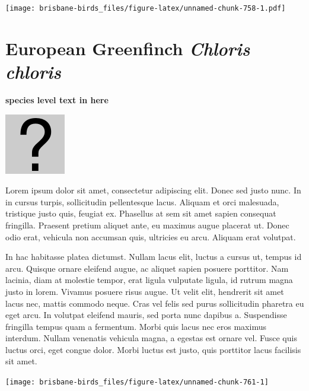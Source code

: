 \documentclass[]{book}
\let\origfigure\figure
\let\endorigfigure\endfigure
\renewenvironment{figure}[1][2] {
  \expandafter\origfigure\expandafter[H]
} {
  \endorigfigure
}
\begin{document}
\begin{figure}
\centering
\texttt{[image: brisbane-birds\_files/figure-latex/unnamed-chunk-758-1.pdf]}
\caption{\label{fig:unnamed-chunk-758}insert figure caption}
\end{figure}

\section{\texorpdfstring{European Greenfinch \emph{Chloris
chloris}}{European Greenfinch Chloris chloris}}\label{european-greenfinch-chloris-chloris}

\textbf{species level text in here}

\begin{figure}
\centering
\includegraphics{assets/missing.png}
\caption{No image for species}
\end{figure}

Lorem ipsum dolor sit amet, consectetur adipiscing elit. Donec sed justo
nunc. In in cursus turpis, sollicitudin pellentesque lacus. Aliquam et
orci malesuada, tristique justo quis, feugiat ex. Phasellus at sem sit
amet sapien consequat fringilla. Praesent pretium aliquet ante, eu
maximus augue placerat ut. Donec odio erat, vehicula non accumsan quis,
ultricies eu arcu. Aliquam erat volutpat.

In hac habitasse platea dictumst. Nullam lacus elit, luctus a cursus ut,
tempus id arcu. Quisque ornare eleifend augue, ac aliquet sapien posuere
porttitor. Nam lacinia, diam at molestie tempor, erat ligula vulputate
ligula, id rutrum magna justo in lorem. Vivamus posuere risus augue. Ut
velit elit, hendrerit sit amet lacus nec, mattis commodo neque. Cras vel
felis sed purus sollicitudin pharetra eu eget arcu. In volutpat eleifend
mauris, sed porta nunc dapibus a. Suspendisse fringilla tempus quam a
fermentum. Morbi quis lacus nec eros maximus interdum. Nullam venenatis
vehicula magna, a egestas est ornare vel. Fusce quis luctus orci, eget
congue dolor. Morbi luctus est justo, quis porttitor lacus facilisis sit
amet.

\begin{figure}
\texttt{[image: brisbane-birds\_files/figure-latex/unnamed-chunk-761-1]} \caption{insert figure caption}\label{fig:unnamed-chunk-761}
\end{figure}
\end{document}

